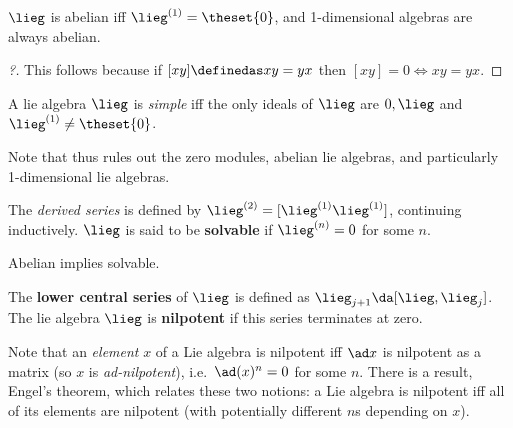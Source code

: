 \begin{lemma}

\(\lieg\) is abelian iff \(\lieg^{(1)} = \theset{0}\), and 1-dimensional
algebras are always abelian.

\end{lemma}

\begin{proof}[?]

This follows because if \([x y] \definedas xy = yx\) then
\([x y] = 0 \iff xy = yx\).

\end{proof}

\begin{definition}

A lie algebra \(\lieg\) is \emph{simple} iff the only ideals of
\(\lieg\) are \(0, \lieg\) and \(\lieg^{(1)} \neq \theset{0}\).

\end{definition}

Note that thus rules out the zero modules, abelian lie algebras, and
particularly 1-dimensional lie algebras.

\begin{definition}

The \emph{derived series} is defined by
\(\lieg^{(2)} = [\lieg^{(1)} \lieg^{(1)}]\), continuing inductively.
\(\lieg\) is said to be \textbf{solvable} if \(\lieg^{(n)} = 0\) for
some \(n\).

\end{definition}

\begin{lemma}[?]

Abelian implies solvable.

\end{lemma}

\begin{definition}

The \textbf{lower central series} of \(\lieg\) is defined as
\(\lieg_{j+1} \da [\lieg, \lieg_j]\). The lie algebra \(\lieg\) is
\textbf{nilpotent} if this series terminates at zero.

\end{definition}

\begin{remark}

Note that an \emph{element} \(x\) of a Lie algebra is nilpotent iff
\(\ad x\) is nilpotent as a matrix (so \(x\) is \emph{ad-nilpotent}),
i.e.~\(\ad(x)^n =0\) for some \(n\). There is a result, Engel's theorem,
which relates these two notions: a Lie algebra is nilpotent iff all of
its elements are nilpotent (with potentially different \(n\)s depending
on \(x\)).

\end{remark}


